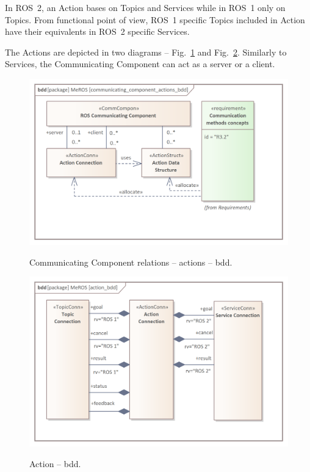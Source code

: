 \documentclass[11pt,oneside,a4paper]{article}
\begin{document}
	In ROS~2, an Action bases on Topics and Services while in ROS~1 only on Topics. From functional point of view, ROS~1 specific Topics included in Action have their equivalents in ROS~2 specific Services. 
	
	\pagebreak
	
	The Actions are depicted in two diagrams -- Fig.~\ref{fig:communicating_component_actions_bdd} and Fig.~\ref{fig:action_bdd}. Similarly to Services, the Communicating Component can act as a server or a client.	 
	
	
	\begin{figure}[H]
		\centering
		\begin{center}
			{\includegraphics[scale=1.1]{img/meros_pkg/communicating_component_actions_bdd.png}}
		\end{center}
		\caption{Communicating Component relations -- actions -- bdd.} 
		\label{fig:communicating_component_actions_bdd}
	\end{figure}
	
	\begin{figure}[hbt]
		\centering
		\begin{center}
			{\includegraphics[scale=1.1]{img/meros_pkg/action_bdd.png}}
		\end{center}
		\caption{Action -- bdd.} 
		\label{fig:action_bdd}
	\end{figure}
	
\end{document}
